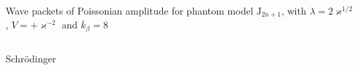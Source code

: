 \documentclass[8pt]{beamer}
\begin{document}
\begin{frame}%
{Wave packets of Poissonian amplitude for phantom model}%
{$\mathrm{J}_{2n+1}$, with $\lambda = 2\varkappa^{1/2}$,
$V = +\varkappa^{-2}$ and $\overline{k}_\beta = 8$}
\begin{columns}
\begin{column}{.49\textwidth}
\begin{block}{Schrödinger}

\end{block}
\end{column}
\end{columns}
\end{frame}
\end{document}
